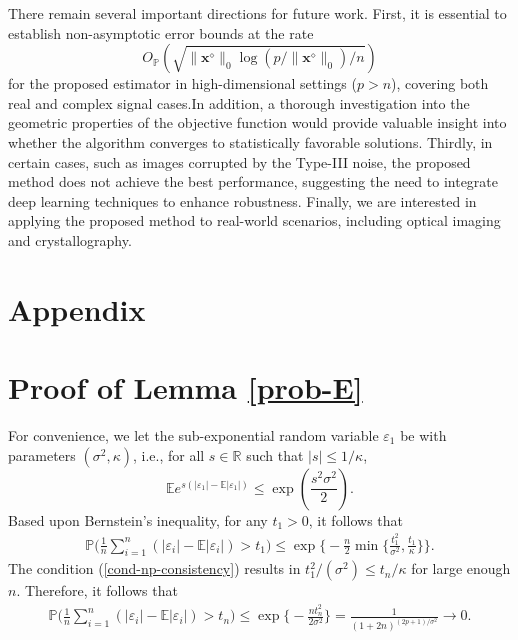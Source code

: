 \documentclass{article}
\numberwithin{equation}{section}
\begin{document}
There remain several important directions for future work. First, it is essential to establish non-asymptotic error bounds at the rate 
 	$$ O_{\mathbb{P}}\left( \sqrt{  \|\mathbf{x}^\diamond\|_0 \log (p / \|\mathbf{x}^\diamond\|_0)/ n  } \right) $$ 
 	for the proposed estimator in high-dimensional settings ($p > n$), covering both real and complex signal cases.In addition, a thorough investigation into the geometric properties of the objective function would provide valuable insight into whether the algorithm converges to statistically favorable solutions. Thirdly, in certain cases, such as images corrupted by the Type-III noise, the proposed method does not achieve the best performance, suggesting the need to integrate deep learning techniques to enhance robustness. Finally, we are interested in applying the proposed method to real-world scenarios, including optical imaging and crystallography.
 
 

 

 
 
 
 
 




\section*{Appendix}
\appendix


\section{Proof of Lemma \ref{prob-E} }

 For convenience, we let the sub-exponential random variable $\varepsilon_1$ be  with parameters $(\sigma^2,\kappa)$, i.e., for all $s\in\mathbb{R}$ such that $|s|\leq 1/\kappa$,
$$\mathbb{E}e^{s(|\varepsilon_1|-\mathbb{E}|\varepsilon_1|)}\leq\exp(\frac{s^2\sigma^2}{2}).$$
Based upon Bernstein's inequality, for any $t_1>0$, it follows that \begin{equation}
	\begin{aligned}
		\mathbb{P}\Big(\frac{1}{n}\sum_{i=1}^n(|\varepsilon_i|-\mathbb{E}|\varepsilon_i|)>t_1\Big)\leq \exp\Big\lbrace -\frac{n}{2}\min\Big\{\frac{t_1^2}{\sigma^2},\frac{t_1}{\kappa}\Big\}\Big\rbrace.
	\end{aligned}\nonumber
\end{equation}
The condition (\ref{cond-np-consistency}) results in $t_1^2/(\sigma^2)\leq t_n/\kappa$ for large enough $n$. 
Therefore, it follows that
\begin{equation}\label{prob-E1}
	\begin{aligned}
		\mathbb{P}\Big(\frac{1}{n}\sum_{i=1}^n(|\varepsilon_i|-\mathbb{E}|\varepsilon_i|)>t_n\Big)\leq \exp\big\lbrace -\frac{nt_n^2}{2\sigma^2} \big\rbrace
		=\frac{1}{(1+2n)^{(2p+1)/\sigma^2}}\to0.
	\end{aligned}
\end{equation}
 
\end{document}

